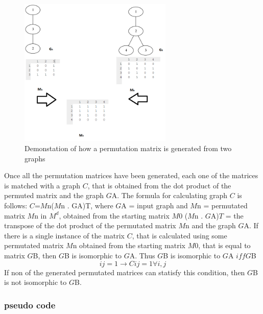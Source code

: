 \begin{figure}[H]
  \begin{center}
      \includegraphics[width=0.65\textwidth]{stratMatrix}
  \end{center}    
  \caption{Demonstation of how a permutation matrix is generated from two graphs} 
  \label{fig:permutationmatrix}
\end{figure} 
Once all the permutation matrices have been generated, each one of the matrices is matched with a graph $C$, that is obtained from the dot product of the permuted matrix and the graph $G${\tiny A}.
The formula for calculating graph $C$ is follows:
$C$=$M${\tiny n}($M${\tiny n} . G{\tiny A})T, where $G${\tiny A} = input graph and  $M${\tiny n} = permutated matrix $M${\tiny n} in $M^d$, obtained from the starting matrix $M0$ ($M${\tiny n} . $G${\tiny A})$T$ = the transpose of the dot product of the permutated matrix $M${\tiny n} and the graph $G${\tiny A}.
If there is a single instance of the matrix $C$, that is calculated using some permutated matrix $M${\tiny n} obtained from the starting matrix $M0$, that is equal to matrix $G${\tiny B}, then $G${\tiny B} is isomorphic to $G${\tiny A}. Thus $G${\tiny B} is isomorphic to $G${\tiny A} $iff G${\tiny B}
  \begin{equation}	
	ij = 1 \rightarrow  Cij = 1 \forall i,j
  \end{equation} 
If non of the generated permutated matrices can statisfy this condition, then $G${\tiny B} is not isomorphic to $G${\tiny B}.

\subsubsection{pseudo code}

